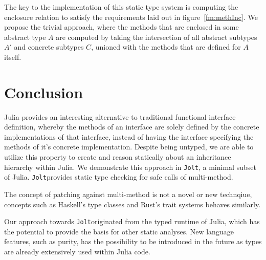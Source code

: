 \documentclass[preprint]{sigplanconf}
\newcommand{\xt}[1]{\texttt{#1}}
\newcommand{\jolt}{\xt{Jolt}}
\begin{document}
The key to the implementation of this static type system is computing the 
enclosure relation to satisfy the requirements laid out in figure~\ref{fm:methInc}.
We propose the trivial approach, where the methods that are enclosed in some
abstract type $A$ are computed by taking the intersection of all abstract subtypes
$A'$ and concrete subtypes $C$, unioned with the methods that are defined for $A$
itself. 

\section{Conclusion}

Julia provides an interesting alternative to traditional functional interface 
definition, whereby the methods of an interface are solely defined by 
the concrete implementations of that interface, instead of having the interface specifying
the methods of it's concrete implementation. Despite being
untyped, we are able to utilize this property to create and reason statically about an inheritance
hierarchy within Julia. We demonstrate this approach in \jolt\space, a minimal subset
of Julia. \jolt\space provides static type checking for safe calls of multi-method.

The concept of patching against multi-method is not a novel or new technqiue, concepts such 
as Haskell's type classes and Rust's trait systems behaves similarly.

Our approach towards \jolt originated from the typed runtime of Julia, which has the potential to
provide the basis for other static analyses. New language features, such as purity, has the possibility
to be introduced in the future as types are already extensively used within Julia code.



\end{document}
